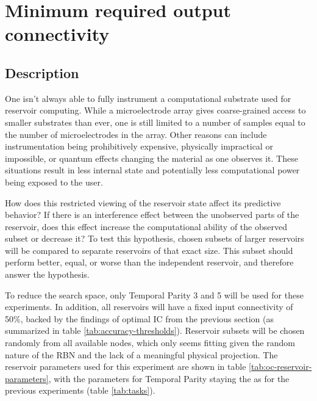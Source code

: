 \section{Minimum required output connectivity}

\subsection{Description}

One isn't always able to fully instrument a computational substrate used for reservoir computing.
While a microelectrode array gives coarse-grained access to smaller substrates than ever,
one is still limited to a number of samples equal to the number of microelectrodes in the array.
Other reasons can include instrumentation being prohibitively expensive,
physically impractical or impossible,
or quantum effects changing the material as one observes it.
These situations result in less internal state and potentially less computational power being exposed to the user.

How does this restricted viewing of the reservoir state affect its predictive behavior?
If there is an interference effect between the unobserved parts of the reservoir,
does this effect increase the computational ability of the observed subset or decrease it?
To test this hypothesis,
chosen subsets of larger reservoirs will be compared to separate reservoirs of that exact size.
This subset should perform better, equal, or worse than the independent reservoir, and therefore answer the hypothesis.

To reduce the search space, only Temporal Parity 3 and 5 will be used for these experiments.
In addition, all reservoirs will have a fixed input connectivity of 50\%,
backed by the findings of optimal IC from the previous section (as summarized in table \ref{tab:accuracy-thresholds}).
Reservoir subsets will be chosen randomly from all available nodes,
which only seems fitting given the random nature of the RBN and the lack of a meaningful physical projection.
The reservoir parameters used for this experiment are shown in table \ref{tab:oc-reservoir-parameters},
with the parameters for Temporal Parity staying the as for the previous experiments (table \ref{tab:tasks}).

